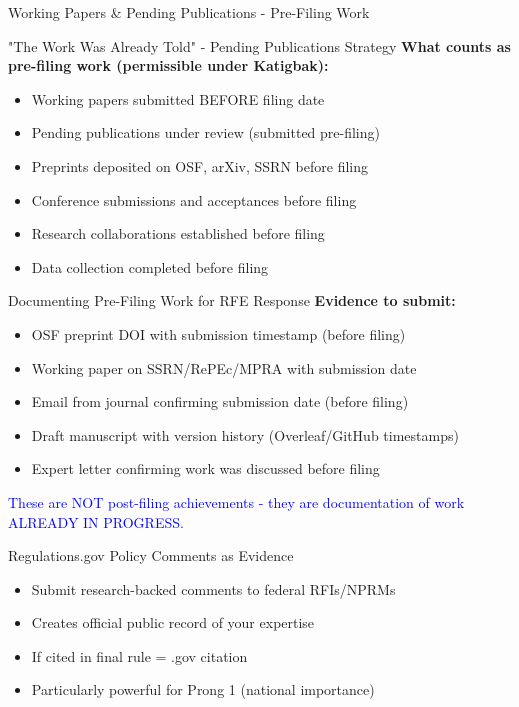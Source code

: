 \documentclass[11pt]{beamer}
\begin{document}
	\begin{frame}{Working Papers \& Pending Publications - Pre-Filing Work}
		\scriptsize
		\begin{block}{"The Work Was Already Told" - Pending Publications Strategy}
			\textbf{What counts as pre-filing work (permissible under Katigbak):}
			\begin{itemize}
				\item Working papers submitted BEFORE filing date
				\item Pending publications under review (submitted pre-filing)
				\item Preprints deposited on OSF, arXiv, SSRN before filing
				\item Conference submissions and acceptances before filing
				\item Research collaborations established before filing
				\item Data collection completed before filing
			\end{itemize}
		\end{block}
		
		\begin{block}{Documenting Pre-Filing Work for RFE Response}
			\textbf{Evidence to submit:}
			\begin{itemize}
				\item OSF preprint DOI with submission timestamp (before filing)
				\item Working paper on SSRN/RePEc/MPRA with submission date
				\item Email from journal confirming submission date (before filing)
				\item Draft manuscript with version history (Overleaf/GitHub timestamps)
				\item Expert letter confirming work was discussed before filing
			\end{itemize}
			\textcolor{blue}{These are NOT post-filing achievements - they are documentation of work ALREADY IN PROGRESS.}
		\end{block}
		
		\begin{block}{Regulations.gov Policy Comments as Evidence}
			\begin{itemize}
				\item Submit research-backed comments to federal RFIs/NPRMs
				\item Creates official public record of your expertise
				\item If cited in final rule = .gov citation
				\item Particularly powerful for Prong 1 (national importance)
			\end{itemize}
		\end{block}
	\end{frame}
	
\end{document}
